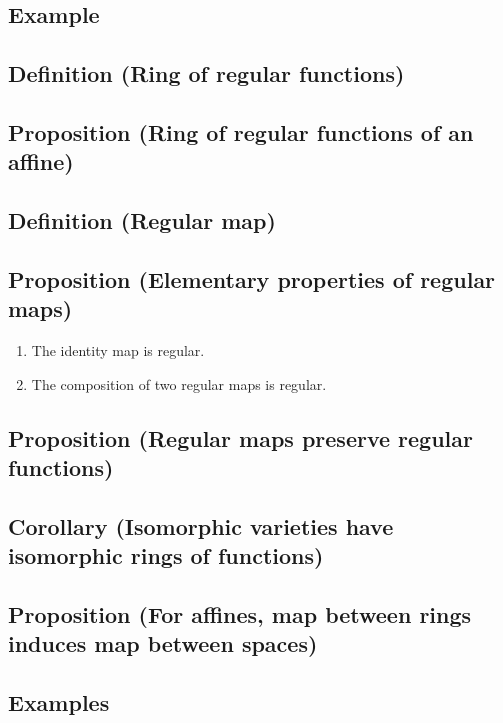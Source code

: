 \documentclass[11pt]{article}
\begin{document}
\subsection{Example}
\label{sec:orga73f33c}
\subsection{Definition (Ring of regular functions)}
\label{sec:org7529a73}
\subsection{Proposition (Ring of regular functions of an affine)}
\label{sec:org094ca06}
\subsection{Definition (Regular map)}
\label{sec:org3b29850}
\subsection{Proposition (Elementary properties of regular maps)}
\label{sec:orgf4694e7}
\begin{enumerate}
\item The identity map is regular.
\item The composition of two regular maps is regular.
\end{enumerate}
\subsection{Proposition (Regular maps preserve regular functions)}
\label{sec:orgc3cffc2}
\subsection{Corollary (Isomorphic varieties have isomorphic rings of functions)}
\label{sec:org7b9a76b}
\subsection{Proposition (For affines, map between rings induces map between spaces)}
\label{sec:org4774830}
\subsection{Examples}
\label{sec:org7733d1c}
\end{document}
